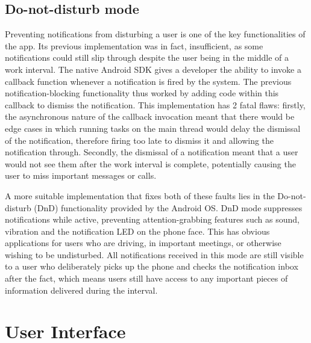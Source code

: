 \subsection{Do-not-disturb mode}
Preventing notifications from disturbing a user is one of the key functionalities of the app. Its previous implementation was in fact, insufficient, as some notifications could still slip through despite the user being in the middle of a work interval. The native Android SDK gives a developer the ability to invoke a callback function whenever a notification is fired by the system. The previous notification-blocking functionality thus worked by adding code within this callback to dismiss the notification. This implementation has 2 fatal flaws: firstly, the asynchronous nature of the callback invocation meant that there would be edge cases in which running tasks on the main thread would delay the dismissal of the notification, therefore firing too late to dismiss it and allowing the notification through. Secondly, the dismissal of a notification meant that a user would not see them after the work interval is complete, potentially causing the user to miss important messages or calls.

A more suitable implementation that fixes both of these faults lies in the Do-not-disturb (DnD) functionality provided by the Android OS. DnD mode suppresses notifications while active, preventing attention-grabbing features such as sound, vibration and the notification LED on the phone face. This has obvious applications for users who are driving, in important meetings, or otherwise wishing to be undisturbed. All notifications received in this mode are still visible to a user who deliberately picks up the phone and checks the notification inbox after the fact, which means users still have access to any important pieces of information delivered during the interval.


\section{User Interface}